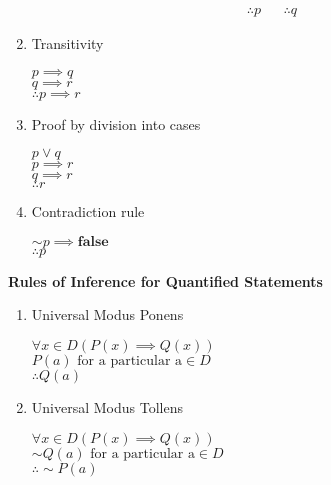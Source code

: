 \documentclass[landscape, a4paper]{article}
\newcommand{\Or}{\vee}
\newcommand{\false}{\textbf{false}}
\begin{document}
\begin{multicols*}{4}
\begin{enumerate}[wide, labelindent=2pt]
\begin{align*}
                  \therefore p &  & \therefore q
              \end{align*}
        \item Transitivity
              \vspace{-4pt} \par {\centering
                  $p\implies q$ \\
                  $q \implies r$ \\
                  $\therefore p \implies r $ \par
              }
        \item Proof by division into cases
              \vspace{-4pt} \par {\centering
                  $p\Or q$ \\
                  $p\implies r$ \\
                  $q\implies r$ \\
                  $\therefore r $ \par
              }
        \item Contradiction rule\\
              \vspace{-16pt} \par {\centering
                  ${\sim} p \implies \false$ \\
                  $\therefore p $ \par
              }
    \end{enumerate}
    \noindent\textbf{Rules of Inference for Quantified Statements}
    \begin{enumerate}[wide, labelindent=2pt]
        \item Universal Modus Ponens
              \par {\centering
                  $\forall x\in D (P(x)\implies Q(x))$\\
                  $P(a) \text{ for a particular a}\in D$\\
                  $\therefore Q(a)$\par
              }
        \item Universal Modus Tollens
              \par {\centering
                  $\forall x\in D (P(x)\implies Q(x))$        \\
                  ${\sim} Q(a) \text{ for a particular a}\in D$ \\
                  $\therefore {\sim} P(a)$ \par
}
\end{enumerate}
\end{multicols*}
\end{document}
